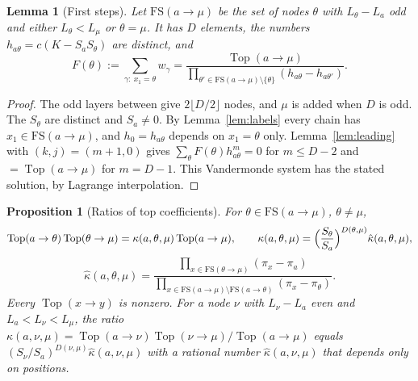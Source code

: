 \documentclass[11pt]{article}
\newtheorem{proposition}[theorem]{Proposition}
\newtheorem{lemma}[theorem]{Lemma}
\theoremstyle{remark}
\begin{document}
\begin{lemma}[First steps]\label{lem:firststeps}
Let $\mathrm{FS}(a\to\mu)$ be the set of nodes $\theta$ with $L_\theta-L_a$ odd
and either $L_\theta<L_\mu$ or $\theta=\mu$.  It has $D$ elements, the numbers
$h_{a\theta}=c(K-S_aS_\theta)$ are distinct, and
\[
 F(\theta):=\sum_{\gamma:\ x_1=\theta}w_\gamma
 =\frac{\operatorname{Top}(a\to\mu)}{\prod_{\theta'\in\mathrm{FS}(a\to\mu)\setminus\{\theta\}}
 (h_{a\theta}-h_{a\theta'})}.
\]
\end{lemma}

\begin{proof}
The odd layers between give $2\lfloor D/2\rfloor$ nodes, and $\mu$ is added when
$D$ is odd.  The $S_\theta$ are distinct and $S_a\ne0$.  By
Lemma~\ref{lem:labels} every chain has $x_1\in\mathrm{FS}(a\to\mu)$, and
$h_0=h_{a\theta}$ depends on $x_1=\theta$ only.  Lemma~\ref{lem:leading} with
$(k,j)=(m+1,0)$ gives $\sum_\theta F(\theta)h_{a\theta}^m=0$ for $m\le D-2$ and
$=\operatorname{Top}(a\to\mu)$ for $m=D-1$.  This Vandermonde system has the
stated solution, by Lagrange interpolation.
\end{proof}

\begin{proposition}[Ratios of top coefficients]\label{prop:kappa}
For $\theta\in\mathrm{FS}(a\to\mu)$, $\theta\ne\mu$,
\[
 \operatorname{Top}(a\to\theta)\operatorname{Top}(\theta\to\mu)
 =\kappa(a,\theta,\mu)\operatorname{Top}(a\to\mu),\qquad
 \kappa(a,\theta,\mu)=\Bigl(\frac{S_\theta}{S_a}\Bigr)^{D(\theta,\mu)}
 \hat\kappa(a,\theta,\mu),
\]
\[
 \hat\kappa(a,\theta,\mu)=
 \frac{\prod_{x\in\mathrm{FS}(\theta\to\mu)}(\pi_x-\pi_a)}
      {\prod_{x\in\mathrm{FS}(a\to\mu)\setminus\mathrm{FS}(a\to\theta)}(\pi_x-\pi_\theta)} .
\]
Every $\operatorname{Top}(x\to y)$ is nonzero.  For a node $\nu$ with
$L_\nu-L_a$ even and $L_a<L_\nu<L_\mu$, the ratio
$\kappa(a,\nu,\mu)=\operatorname{Top}(a\to\nu)\operatorname{Top}(\nu\to\mu)/\operatorname{Top}(a\to\mu)$
equals $(S_\nu/S_a)^{D(\nu,\mu)}\hat\kappa(a,\nu,\mu)$ with a rational number
$\hat\kappa(a,\nu,\mu)$ that depends only on positions.
\end{proposition}
\end{document}
